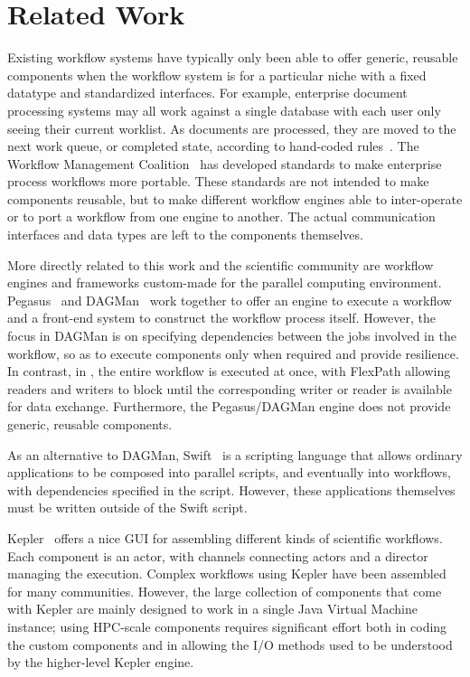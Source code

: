 \section{Related Work}
\label{s:related}

Existing workflow systems have typically only been able to offer generic,
reusable components when the workflow system is for a particular niche with a
fixed datatype and standardized interfaces. For example, enterprise document
processing systems may all work against a single database with each user only
seeing their current worklist. As documents are processed, they are moved to
the next work queue, or completed state, according to hand-coded
rules~\cite{mckesson-workflow}. The Workflow Management Coalition~\cite{wfmc}
has developed standards to make enterprise process workflows more portable.
These standards are not intended to make components reusable, but to make
different workflow engines able to inter-operate or to port a workflow from one
engine to another.  The actual communication interfaces and data types are left
to the components themselves.

More directly related to this work and the scientific community are workflow
engines and frameworks custom-made for the parallel computing environment.
Pegasus~\cite{mullender:pegasus} and DAGMan~\cite{Malewicz:2006:dagman} work
together to offer an engine to execute a workflow and a front-end system to
construct the workflow process itself.
However, the focus in DAGMan is on specifying dependencies between
the jobs involved in the workflow, so as to execute
components only when required and provide resilience.
In contrast, in \sys, the entire workflow is executed at once, with
FlexPath allowing readers and writers to block until
the corresponding writer or reader is available for data exchange.
Furthermore, the Pegasus/DAGMan engine does not provide
generic, reusable components.

As an alternative to DAGMan, Swift~\cite{wilde2011swift}
is a scripting language that allows ordinary applications
to be composed into parallel scripts, and eventually into
workflows, with dependencies specified in the script.
However, these applications themselves
must be written outside of the Swift script.

Kepler~\cite{bertram:2006:kepler} offers a nice GUI for assembling different
kinds of scientific workflows.
Each component is an actor, with channels connecting
actors and a director managing the execution.
Complex workflows using Kepler have been
assembled for many communities.
However, the large collection of components
that come with Kepler are mainly designed
to work in a single Java Virtual Machine instance;
using HPC-scale components requires significant effort
both in coding the custom components and in
allowing the I/O methods used to be understood by the
higher-level
Kepler engine.

